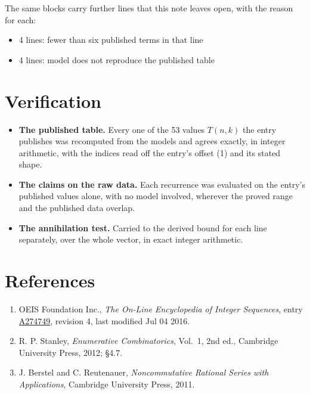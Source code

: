 \documentclass[11pt]{article}
\theoremstyle{definition}
\begin{document}
The same blocks carry further lines that this note leaves open, with the reason for each:

\begin{itemize}

\item 4 lines: fewer than six published terms in that line

\item 4 lines: model does not reproduce the published table

\end{itemize}

\section{Verification}

\begin{itemize}

\item {\bfseries The published table.} Every one of the 53 values $T(n,k)$ the entry publishes was recomputed from the models and agrees exactly, in integer arithmetic, with the indices read off the entry's offset (1) and its stated shape.

\item {\bfseries The claims on the raw data.} Each recurrence was evaluated on the entry's published values alone, with no model involved, wherever the proved range and the published data overlap.

\item {\bfseries The annihilation test.} Carried to the derived bound for each line separately, over the whole vector, in exact integer arithmetic.

\end{itemize}

\section{References}

\begin{enumerate}

\item OEIS Foundation Inc., \emph{The On-Line Encyclopedia of Integer Sequences}, entry \href{https://oeis.org/A274749}{A274749}, revision 4, last modified Jul 04 2016.

\item R. P. Stanley, \emph{Enumerative Combinatorics}, Vol.~1, 2nd ed., Cambridge University Press, 2012; \S4.7.

\item J. Berstel and C. Reutenauer, \emph{Noncommutative Rational Series with Applications}, Cambridge University Press, 2011.

\end{enumerate}
\end{document}
